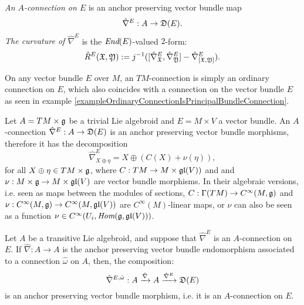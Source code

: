 \begin{definition}
\emph{An $A$-connection on $E$} is an anchor preserving vector bundle map
\begin{equation}
    \hat \nabla^E: A \to \mathfrak{D}(E).
\end{equation}
\emph{The curvature of $\hat \nabla^E$} is the $\operatorname{\textit{End}}(E)$-valued $2$-form:
\begin{equation}
    \hat R^E(\mathfrak{X}, \mathfrak{Y}) := j^{-1}([\hat \nabla^E_{\mathfrak{X}}, \hat \nabla^E_{\mathfrak{Y}}] - \hat \nabla^E_{[\mathfrak{X}, \mathfrak{Y}]}).
\end{equation}
\end{definition}

\begin{example}
On any vector bundle $E$ over $M$, an $TM$-connection is simply an ordinary connection on $E$, which also coincides with a connection on the vector bundle $E$ as seen in example \ref{exampleOrdinaryConnectionIsPrincipalBundleConnection}.
\end{example}

\begin{example}
\label{exampleAllTLATrivialLieAlgebroidConnectionsOnTrivialVectorBundle}
Let $A = TM \times \mathfrak{g}$ be a trivial Lie algebroid and $E = M \times V$ a vector bundle. An $A$-connection $\hat \nabla^E: A \to \mathfrak{D}(E)$ is an anchor preserving vector bundle morphisms, therefore it has the decomposition
\begin{equation}
    \hat \nabla^E_{X \oplus \eta} = X \oplus (C(X) + \nu(\eta)),
\end{equation}
for all $X \oplus \eta \in TM \times \mathfrak{g}$, where
$C: TM \to M \times \mathfrak{gl}(V))$ and and $\nu: M \times \mathfrak{g} \to M \times \mathfrak{gl}(V)$ are vector bundle morphisms. In their algebraic versions, i.e. seen as maps between the modules of sections, $C : \Gamma(TM) \to C^\infty(M, \mathfrak{g})$ and $\nu: C^\infty(M, \mathfrak{g}) \to C^\infty(M, \mathfrak{gl}(V))$ are $C^\infty(M)$-linear maps, or $\nu$ can also be seen as a function $\nu \in C^\infty(U_i, \operatorname{\textit{Hom}}(\mathfrak{g}, \mathfrak{gl}(V)))$.
\end{example}

\begin{example}
Let $A$ be a transitive Lie algebroid, and suppose that $\hat \nabla^E$ is an $A$-connection on $E$. If $\hat \nabla:A \to A$ is the anchor preserving vector bundle endomorphism associated to a connection $\hat \omega$ on $A$, then, the composition:
\begin{equation}
    \hat \nabla^{E, \hat \omega} : A \xrightarrow{\hat \nabla} A \xrightarrow{\hat \nabla^E} \mathfrak{D}(E)
\end{equation}
is an anchor preserving vector bundle morphism, i.e. it is an $A$-connection on $E$.
\end{example}

